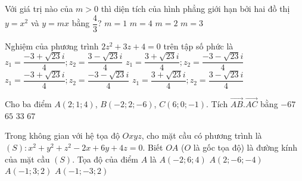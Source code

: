 \begin{ex}%
Với giá trị nào của $m>0$ thì diện tích của hình phẳng giới hạn bởi hai đồ thị $y = x^2$ và $y = mx$ bằng $\dfrac{4}{3}$?
\choice
{$m = 1$}
{$m = 4$}
{\True $m = 2$}
{$m = 3$}
\end{ex}



\begin{ex}%
Nghiệm của phương trình $2z^2 + 3z + 4 = 0$ trên tập số phức là
\choice
{$z_1 = \dfrac{-3 + \sqrt{23}i}{4}; z_2 = \dfrac{3 - \sqrt{23}i}{4}$}
{$z_1 = \dfrac{3 + \sqrt{23}i}{4}; z_2 = \dfrac{-3 - \sqrt{23}i}{4}$}
{\True $z_1 = \dfrac{-3 + \sqrt{23}i}{4}; z_2 =  \dfrac{-3 - \sqrt{23}i}{4}$}
{$z_1 = \dfrac{3 + \sqrt{23}i}{4}; z_2 = \dfrac{3 - \sqrt{23}i}{4}$}
\end{ex}



\begin{ex}%
Cho ba điểm $A(2; 1; 4)$, $B(-2; 2; -6)$, $C(6; 0; -1)$. Tích $\overrightarrow{AB}.\overrightarrow{AC}$ bằng
\choice
{$-67$}
{$65$}
{\True $33$}
{$67$}
\end{ex}




\begin{ex}%
Trong không gian với hệ tọa độ $Oxyz$, cho mặt cầu có phương trình là $(S): x^2 + y^2 + z^2 - 2x + 6y + 4z = 0$. Biết $OA$ ($O$ là gốc tọa độ) là đường kính của mặt cầu $(S)$. Tọa độ của điểm $A$ là
\choice
{$A(-2; 6; 4)$}
{\True $A(2; -6; -4)$}
{$A(-1; 3; 2)$}
{$A(-1; -3; 2)$}
\end{ex}





